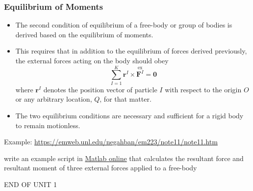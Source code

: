 \documentclass[11pt]{article}
\begin{document}
\subsubsection*{Equilibrium of Moments}
\label{sec:orgf6e7115}
\begin{itemize}
\item The second condition of equilibrium of a free-body or group of bodies is derived based on the equilibrium of moments.
\item This requires that in addition to the equilibrium of forces derived previously, the external forces acting on the body should obey
$$ \sum_{I=1}^K \boldsymbol{r}^I \times \overset{\mathrm{ex}}{\boldsymbol{F}^I} =  \boldsymbol{0} $$
where \(\boldsymbol{r}^I\) denotes the position vector of particle \(I\) with respect to the origin \(O\) or any arbitrary location, \(Q\), for that matter.
\item The two equilibrium conditions are necessary and sufficient for a rigid body to remain motionless.
\end{itemize}

Example:
\url{https://emweb.unl.edu/negahban/em223/note11/note11.htm}

write an example script in \href{https://www.mathworks.com}{Matlab online} that calculates the resultant force and resultant moment of three external forces applied to a free-body

END OF UNIT 1
\end{document}

